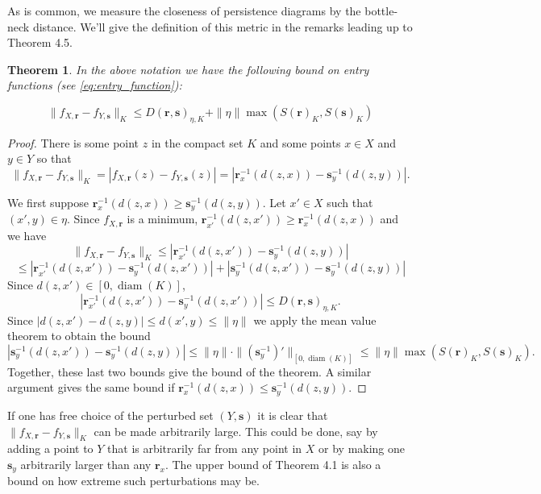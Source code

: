 \documentclass{amsart}
\newtheorem{theorem}{Theorem}[section]
\newtheorem*{fibering lemma}{Fibering Lemma}
\newtheorem*{decomposition lemma}{Decomposition Lemma}
\newtheorem*{hurewicz theorem}{Hurewicz Theorem}
\theoremstyle{definition}
\DeclareMathOperator{\diam}{diam}
\begin{document}
As is common, we measure the closeness of persistence diagrams by the bottle-neck distance.  We'll give the definition of this metric in the remarks leading up to Theorem 4.5.



\begin{theorem} \label{thm:stability}
In the above notation we have the following bound on entry functions (see \eqref{eq:entry_function}): 

\[\|f_{X,\mathbf{r}}-f_{Y,\mathbf{s}}\|_K\le D(\mathbf{r},\mathbf{s})_{\eta,K}+ \|\eta\| \max( S(\mathbf{r})_K, S(\mathbf{s})_K)\]
\end{theorem}

\begin{proof}


There is some point $z$ in the compact set $K$ and some points $x \in X$ and $y \in Y$ so that
\[\|f_{X,\mathbf{r}}-f_{Y,\mathbf{s}}\|_{K}=|f_{X,\mathbf{r}}(z)-f_{Y,\mathbf{s}}(z)| = |\mathbf{r}^{-1}_{x}(d(z,x))-\mathbf{s}^{-1}_y(d(z,y))|.\]

We first suppose $\mathbf{r}^{-1}_{x}(d(z,x)) \geq \mathbf{s}^{-1}_{y}(d(z,y))$. Let $x' \in X$ such that $(x',y) \in \eta$.  Since $f_{X,\mathbf{r}}$ is a minimum, $\mathbf{r}^{-1}_{x'}(d(z,x')) \geq \mathbf{r}^{-1}_{x}(d(z,x))$ and we have
\begin{equation} \label{eq:ineq} \|f_{X,\mathbf{r}}-f_{Y,\mathbf{s}}\|_{K} \leq |\mathbf{r}^{-1}_{x'}(d(z,x'))-\mathbf{s}^{-1}_{y}(d(z,y))| \end{equation}
\[\leq |\mathbf{r}^{-1}_{x'}(d(z,x'))-\mathbf{s}^{-1}_{y}(d(z,x'))| + |\mathbf{s}^{-1}_{y}(d(z,x'))-\mathbf{s}^{-1}_{y}(d(z,y))|\]
Since $d(z,x') \in [0,\diam(K)]$, 
\[|\mathbf{r}^{-1}_{x'}(d(z,x'))-\mathbf{s}^{-1}_{y}(d(z,x'))| \leq D(\mathbf{r},\mathbf{s})_{\eta,K}.\]
Since $|d(z,x') - d(z,y)| \leq d(x',y) \leq \|\eta\|$ we apply the mean value theorem to obtain the bound
\[|\mathbf{s}^{-1}_{y}(d(z,x'))-\mathbf{s}^{-1}_{y}(d(z,y))|\le \|\eta\| \cdot \|(\mathbf{s}^{-1}_y)'\|_{[0,\diam(K)]} \leq \|\eta\| \max( S(\mathbf{r})_K, S(\mathbf{s})_K).\]
Together, these last two bounds give the bound of the theorem.  A similar argument gives the same bound if $\mathbf{r}^{-1}_{x}(d(z,x)) \leq \mathbf{s}^{-1}_{y}(d(z,y))$.
\end{proof}

If one has free choice of the perturbed set $(Y,\mathbf{s})$ it is clear that $\|f_{X,\mathbf{r}} - f_{Y,\mathbf{s}}\|_K$ can be made arbitrarily large. This could be done, say by adding a point to $Y$ that is arbitrarily far from any point in $X$ or by making one $\mathbf{s}_y$ arbitrarily larger than any $\mathbf{r}_x$.  The upper bound of Theorem 4.1 is also a bound on how extreme such perturbations may be.
\end{document}
